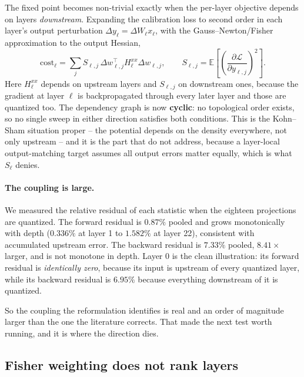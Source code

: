 The fixed point becomes non-trivial exactly when the per-layer objective depends
on layers \emph{downstream}. Expanding the calibration loss to second order in
each layer's output perturbation $\Delta y_\ell=\Delta W_\ell x_\ell$, with the
Gauss--Newton/Fisher approximation to the output Hessian,
\begin{equation}
 \text{cost}_\ell=\sum_j S_{\ell,j}\,\Delta w_{\ell,j}^\top H^{xx}_\ell \Delta w_{\ell,j},
 \qquad
 S_{\ell,j}=\mathbb E\!\left[\left(\frac{\partial\mathcal L}{\partial y_{\ell,j}}\right)^{\!2}\right].
\end{equation}
Here $H^{xx}_\ell$ depends on upstream layers and $S_{\ell,j}$ on downstream
ones, because the gradient at layer $\ell$ is backpropagated through every later
layer and those are quantized too. The dependency graph is now \textbf{cyclic}:
no topological order exists, so no single sweep in either direction satisfies
both conditions. This is the Kohn--Sham situation proper -- the potential
depends on the density everywhere, not only upstream -- and it is the part that
\cite{gptaq,coreq} do not address, because a layer-local output-matching target
assumes all output errors matter equally, which is what $S_\ell$ denies.

\paragraph{The coupling is large.} We measured the relative residual of each
statistic when the eighteen projections are quantized. The forward residual is
$0.87\%$ pooled and grows monotonically with depth ($0.336\%$ at layer 1 to
$1.582\%$ at layer 22), consistent with accumulated upstream error. The backward
residual is $7.33\%$ pooled, $8.41\times$ larger, and is not monotone in depth.
Layer 0 is the clean illustration: its forward residual is \emph{identically
zero}, because its input is upstream of every quantized layer, while its
backward residual is $6.95\%$ because everything downstream of it is quantized.

So the coupling the reformulation identifies is real and an order of magnitude
larger than the one the literature corrects. That made the next test worth
running, and it is where the direction dies.

\subsection{Fisher weighting does not rank layers}
\label{sec:fisherfail}


